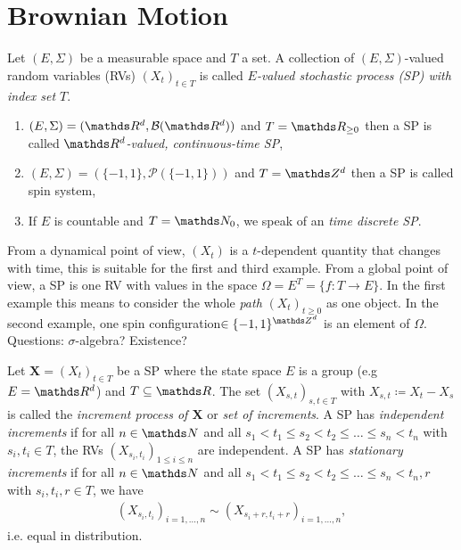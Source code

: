 \chapter{Brownian Motion}
\begin{defi}
Let $(E,\Sigma)$ be a measurable space and $T$ a set.
A collection of $(E,\Sigma)$-valued random variables (RVs) $(X_t)_{t\in T}$ is called \emph{$E$-valued stochastic process (SP) with index set $T$}.
\end{defi}

\begin{bsp}
\begin{enumerate}[label=(\alph*)]
\item $(E,\Sigma)=(\Rd,\mathcal{B}(\Rd))$ and $T=\R_{\geq 0}$ then a SP is called \emph{$\Rd$-valued, continuous-time SP},
\item $(E,\Sigma)=\left(\{-1,1\},\mathcal{P}\left(\{-1,1\}\right)\right)$ and $T=\Z^d$ then a SP is called \glqq spin system\grqq ,
\item If $E$ is countable and $T=\N_0$, we speak of an \emph{time discrete SP}.
\end{enumerate}
\end{bsp}

\begin{bem}
From a dynamical point of view, $(X_t)$ is a $t$-dependent quantity that changes with time, this is suitable for the first and third example.
From a global point of view, a SP is one RV with values in the space $\Omega=E^T=\{f\colon T\to E\}$.
In the first example this means to consider the whole \emph{path} $(X_t)_{t\geq 0}$ as one object.
In the second example, one \glqq spin configuration\grqq $\in \{-1,1\}^{\Z^d}$ is an element of $\Omega$.
Questions: $\sigma$-algebra? Existence?
\end{bem}

\begin{defi}
Let $\textbf{X}=(X_t)_{t\in T}$ be a SP where the state space $E$ is a group (e.g $E=\Rd$) and $T\subseteq \R$.
The set $(X_{s,t})_{s,t\in T}$ with $X_{s,t}\coloneqq X_t-X_s$ is called the \emph{increment process of $\textbf{X}$} or \emph{set of increments}.
A SP has \emph{independent increments} if for all $n\in \N$ and all $s_1<t_1\leq s_2 <t_2\leq \dots \leq s_n<t_n$ with $s_i,t_i \in T$, the RVs $(X_{s_i,t_i})_{1\leq i \leq n}$ are independent.
A SP has \emph{stationary increments} if for all $n\in \N$ and all $s_1<t_1\leq s_2 <t_2\leq \dots \leq s_n<t_n, r$ with $s_i,t_i,r \in T$, we have
\begin{align*}
(X_{s_i,t_i})_{i=1,\dots,n}\sim  (X_{s_i+r,t_i+r})_{i=1,\dots,n},
\end{align*}
i.e. equal in distribution. 
\end{defi}

